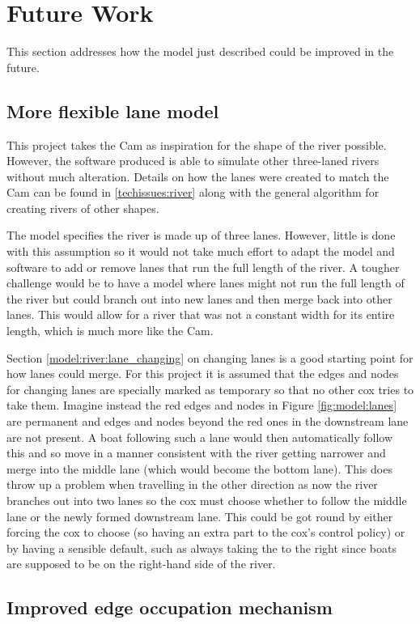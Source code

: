 \section{Future Work}
This section addresses how the model just described could be improved in the future. 

\subsection{More flexible lane model}
This project takes the Cam as inspiration for the shape of the river possible. However, the software produced is able to simulate other three-laned rivers without much alteration. Details on how the lanes were created to match the Cam can be found in \ref{techissues:river} along with the general algorithm for creating rivers of other shapes. 

The model specifies the river is made up of three lanes. However, little is done with this assumption so it would not take much effort to adapt the model and software to add or remove lanes that run the full length of the river. A tougher challenge would be to have a model where lanes might not run the full length of the river but could branch out into new lanes and then merge back into other lanes. This would allow for a river that was not a constant width for its entire length, which is much more like the Cam.

Section \ref{model:river:lane_changing} on changing lanes is a good starting point for how lanes could merge. For this project it is assumed that the edges and nodes for changing lanes are specially marked as temporary so that no other cox tries to take them. Imagine instead the red edges and nodes in Figure \ref{fig:model:lanes} are permanent and edges and nodes beyond the red ones in the downstream lane are not present. A boat following such a lane would then automatically follow this and so move in a manner consistent with the river getting narrower and merge into the middle lane (which would become the bottom lane). This does throw up a problem when travelling in the other direction as now the river branches out into two lanes so the cox must choose whether to follow the middle lane or the newly formed downstream lane. This could be got round by either forcing the cox to choose (so having an extra part to the cox's control policy) or by having a sensible default, such as always taking the to the right since boats are supposed to be on the right-hand side of the river.

\subsection{Improved edge occupation mechanism}

